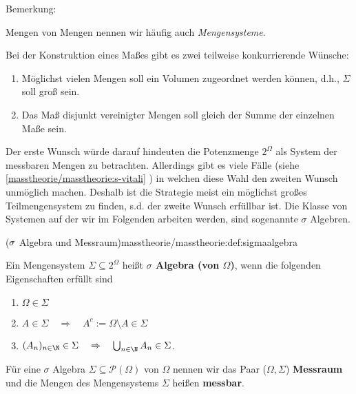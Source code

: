 \documentclass[letterpaper,10pt,german]{jupyterBook}
\begin{document}
\begin{emphBox}{}{}{Bemerkung:}
\par
Mengen von Mengen nennen wir häufig auch \emph{Mengensysteme}.
\end{emphBox}

\par
Bei der Konstruktion eines Maßes gibt es zwei teilweise konkurrierende Wünsche:
\begin{enumerate}

\item {} 
\par
Möglichst vielen Mengen soll ein Volumen zugeordnet werden können, d.h., \(\Sigma\) soll groß sein.

\item {} 
\par
Das Maß disjunkt vereinigter Mengen soll gleich der Summe der einzelnen Maße sein.

\end{enumerate}

\par
Der erste Wunsch würde darauf hindeuten die Potenzmenge \(2^\Omega\) als System der messbaren Mengen zu betrachten. Allerdings gibt es viele Fälle (siehe \cref{masstheorie/masstheorie:s-vitali} ) in welchen diese Wahl den zweiten Wunsch unmöglich machen. Deshalb ist die Strategie meist ein möglichst großes Teilmengensystem zu finden, s.d. der zweite Wunsch erfüllbar ist. Die Klasse von Systemen auf der wir im Folgenden arbeiten werden, sind sogenannte \(\sigma\) Algebren.
\begin{definition}{(\protect\(\sigma\protect\) Algebra und Messraum)}{masstheorie/masstheorie:def:sigmaalgebra}



\par
Ein Mengensystem \(\Sigma \subseteq 2^\Omega\) heißt \textbf{\(\sigma\) Algebra (von \(\Omega\))}, wenn die folgenden Eigenschaften erfüllt sind
\begin{enumerate}

\item {} 
\par
\(\Omega\in \Sigma\)

\item {} 
\par
\(A\in \Sigma \quad \Rightarrow \quad A^c:=\Omega \setminus A\in \Sigma\)

\item {} 
\par
\((A_n)_{n\in\N} \in \Sigma \quad \Rightarrow \quad \bigcup_{n\in \N} A_n\in \Sigma\).

\end{enumerate}

\par
Für eine \(\sigma\) Algebra \(\Sigma \subseteq \mathcal{P}(\Omega)\) von \(\Omega\) nennen wir das Paar (\(\Omega,\Sigma\)) \textbf{Messraum} und die Mengen des Mengensystems \(\Sigma\) heißen \textbf{messbar}.
\end{definition}
\end{document}
